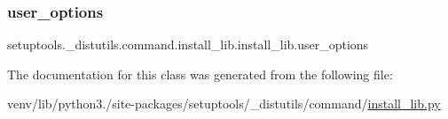 \subsubsection{\texorpdfstring{user\+\_\+options}{user\_options}}
{\footnotesize\ttfamily setuptools.\+\_\+distutils.\+command.\+install\+\_\+lib.\+install\+\_\+lib.\+user\+\_\+options\hspace{0.3cm}{\ttfamily [static]}}



The documentation for this class was generated from the following file\+:\begin{DoxyCompactItemize}
\item 
venv/lib/python3./site-\/packages/setuptools/\+\_\+distutils/command/\hyperlink{__distutils_2command_2install__lib_8py}{install\+\_\+lib.\+py}\end{DoxyCompactItemize}
